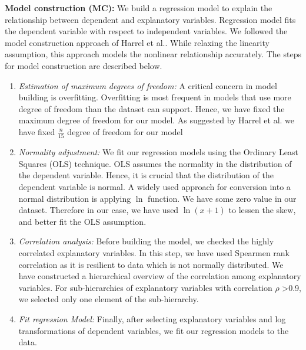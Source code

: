 \textbf{Model construction (MC):} 
We build a regression model to explain the relationship between dependent and explanatory variables. Regression model fits the dependent variable with respect to independent variables. We followed the model construction approach of Harrel et al.\citep{Harrell2015}. While relaxing the linearity assumption, this approach models the nonlinear relationship accurately.
The steps for model construction are described below.
\begin{enumerate}
    \item \emph{Estimation of maximum degrees of freedom:}
    A critical concern in model building is overfitting. Overfitting is most frequent in models that use more degree of freedom than the dataset can support. Hence, we have fixed the maximum degree of freedom for our model. As suggested by Harrel et al.\citep{Harrell2015}  we have fixed  \(\frac{n}{15} \) degree of freedom for our model
    \item \emph{Normality adjustment:}
    We fit our regression models using the Ordinary Least Squares (OLS) technique. OLS assumes the normality in the distribution of the dependent variable. Hence, it is crucial that the distribution of the dependent variable is normal. A widely used approach for conversion into a normal distribution is applying $\ln$ function\citep{pmid25092958}. We have some zero value in our dataset. Therefore in our case, we have used $\ln (x+1) $ to lessen the skew, and better fit the OLS assumption.
    \item \emph{Correlation analysis:}
    Before building the model, we checked the highly correlated explanatory variables. In this step, we have used Spearmen rank correlation as it is resilient to data which is not normally distributed. We have constructed a hierarchical overview of the correlation among explanatory variables. For sub-hierarchies of explanatory variables with correlation $\rho$ \textgreater 0.9, we selected only one element of the sub-hierarchy.
    \item \emph{Fit regression Model:}
    Finally, after selecting explanatory variables and log transformations of dependent variables, we fit our regression models to the data.
\end{enumerate}

